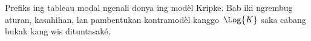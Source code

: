 \documentclass[../../../include/open-logic-chapter]{subfiles}
\begin{document}

\begin{editorial}
Prefiks ing tableau modal ngenali donya ing modèl Kripke. Bab iki ngrembug aturan, kasahihan, lan pambentukan kontramodèl kanggo~$\Log{K}$ saka cabang bukak kang wis dituntasaké.
\end{editorial}


\OLEndChapterHook
\end{document}
